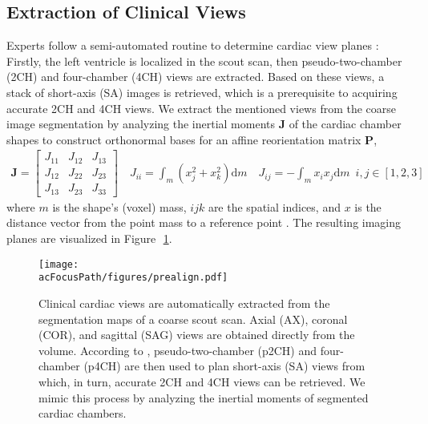     \subsection{Extraction of Clinical Views}
    \label{sec:view_extraction}
    Experts follow a semi-automated routine to determine cardiac view planes \cite{herzog2017cardiovascular}: Firstly, the left ventricle is localized in the scout scan, then pseudo-two-chamber (2CH) and four-chamber (4CH) views are extracted. Based on these views, a stack of short-axis (SA) images is retrieved, which is a prerequisite to acquiring accurate 2CH and 4CH views.
   We extract the mentioned views from the coarse image segmentation by analyzing the inertial moments $\mathbf{J}$
   of the cardiac chamber shapes to construct orthonormal bases for an affine reorientation matrix $\mathbf{P}$,
    \begin{align}
        \mathbf{J} = \begin{bmatrix}
            J_{11} & J_{12} & J_{13}\\
            J_{12} & J_{22} & J_{23}\\
            J_{13} & J_{23} & J_{33}
            \end{bmatrix} \quad  J_{ii}= \int_{m} \left(x_j^2 + x_k^2\right) \text{d}m \quad J_{ij} = -\int_{m} x_i x_j \text{d}m \enspace i,j \in \left[1,2,3\right]
        \label{eq:inertia}
    \end{align}
    where $m$ is the shape's (voxel) mass, $ijk$ are the spatial indices, and $x$ is the distance vector from the point mass to a reference point \cite{czichos2012huette}. The resulting imaging planes are visualized in Figure~\,\ref{fig:prealign}.

    \begin{figure}
        \texttt{[image: \\acFocusPath/figures/prealign.pdf]}
        \caption{Clinical cardiac views are automatically extracted from the segmentation maps of a coarse scout scan. Axial (AX), coronal (COR), and sagittal (SAG) views are obtained directly from the volume. According to \cite{herzog2017cardiovascular}, pseudo-two-chamber (p2CH) and four-chamber (p4CH) are then used to plan short-axis (SA) views from which, in turn, accurate 2CH and 4CH views can be retrieved. We mimic this process by analyzing the inertial moments of segmented cardiac chambers.}
        \label{fig:prealign}
    \end{figure}



